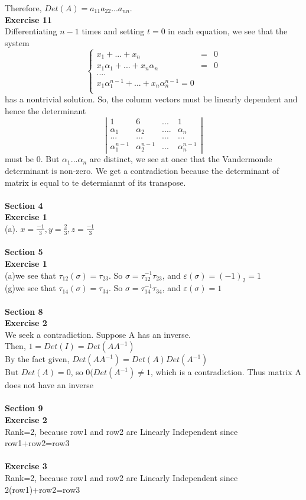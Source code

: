 \documentclass[12pt]{amsart}
\begin{document}
Therefore, $Det(A)=a_{11}a_{22}...a_{nn}$.\\
\textbf{Exercise 11}\\
Differentiating $n-1$ times and setting $t = 0$ in each equation, we see that the system
$$ \left\{
\begin{aligned}
x_1 + ... + x_n & = & 0 \\
x_1\alpha_1 + ... +x_n\alpha_n & = & 0 \\
....\\
x_1{\alpha_1^{n - 1}} + ... + x_n{\alpha_n^{n - 1}} = 0\\
\end{aligned}
\right.
$$ 
has a nontrivial solution. So, the column vectors must be linearly dependent and hence the determinant
$$
\left|\begin{array}{cccc} 
    1 &    6    & ... & 1 \\ 
    \alpha_1 &    \alpha_2   &  .... & \alpha_n\\ 
    ... & ... & ... &... \\
    {\alpha_1^{n - 1}} & {\alpha_2^{n - 1}} & ... & {\alpha_n^{n - 1}} 
\end{array}\right| 
$$
must be $0$. But $\alpha_1 ... \alpha_n$ are distinct, we see at once that the Vandermonde determinant is non-zero. We get a contradiction because the determinant of matrix is equal to te determiannt of its transpose.\\
\\
\textbf{Section 4}\\
\textbf{Exercise 1}\\
(a). $x = \frac{-1}{3}, y = \frac{2}{3}, z = \frac{-1}{3}$ \\
\\
\textbf{Section 5}\\
\textbf{Exercise 1}\\
(a)we see that $\tau_{12}(\sigma) = \tau_{23}$. So $\sigma = {\tau_{12}^{-1}}\tau_{23}$, and $\varepsilon(\sigma) = (-1)_2 = 1$  \\
(g)we see that $\tau_{14}(\sigma) = \tau_{34}$. So $\sigma = {\tau_{14}^{-1}}\tau_{34}$, and $\varepsilon(\sigma) = 1$\\
\\
\textbf{Section 8}\\
\textbf{Exercise 2}\\
We seek a contradiction. Suppose A has an inverse.\\
Then, $1=Det(I)=Det(AA^{-1})$\\
By the fact given, $Det(AA^{-1})=Det(A)Det(A^{-1})$\\
But $Det(A)=0$, so $0(Det(A^{-1})\neq1$, which is a contradiction. Thus matrix A does not have an inverse\\
\\
\textbf{Section 9}\\
\textbf{Exercise 2}\\
Rank=2, because row1 and row2 are Linearly Independent since row1+row2=row3\\
\\
\textbf{Exercise 3}\\
Rank=2, because row1 and row2 are Linearly Independent since 2(row1)+row2=row3\\
\end{document}
